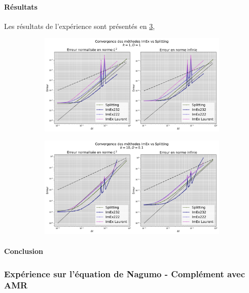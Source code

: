     \paragraph{Résultats}
    Les résultats de l'expérience sont présentés en \ref{fig:imex_vs_splitting},
    \begin{figure}[ht]
        \centering
        \begin{subfigure}{\textwidth}
            \centering
            \includegraphics[width=\linewidth]{media/4_travail/2_nagumo/convergence/ImEx_vs_splitting_k1_D1.pdf}
            \caption{} %
            \label{fig:imex_k1_d1}
        \end{subfigure}
    \begin{subfigure}{\textwidth}
        \centering
        \includegraphics[width=\linewidth]{media/4_travail/2_nagumo/convergence/ImEx_vs_splitting_k10_D0.1.pdf}
        \caption{} %
        \label{fig:imex_k10_d01}
    \end{subfigure}
    \caption{} %
    \label{fig:imex_vs_splitting}
    \end{figure}
    \paragraph{Conclusion}
\subsubsection{Expérience sur l'équation de Nagumo - Complément avec AMR}